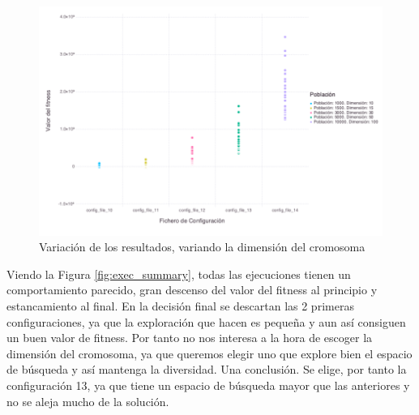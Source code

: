 \begin{figure}[]
	\centering	
	\includegraphics[scale=0.5]{figuras/ps_cd_point.png}
	\caption{ Variación de los resultados, variando la dimensión del cromosoma }
    \label{fig:box_plots_crom_dim}
\end{figure}

Viendo la Figura \ref{fig:exec_summary}, todas las ejecuciones tienen un comportamiento parecido, gran descenso del valor del fitness al principio y estancamiento al final. 
En la decisión final se descartan las 2 primeras configuraciones, ya que la exploración que hacen es pequeña y aun así consiguen un buen valor de fitness. Por tanto
no nos interesa a la hora de escoger la dimensión del cromosoma, ya que queremos elegir uno que explore bien el espacio de búsqueda y así mantenga la diversidad.
Una conclusión. Se elige, por tanto la configuración 13, ya que tiene un espacio de búsqueda mayor que las anteriores y no se aleja mucho de la solución.